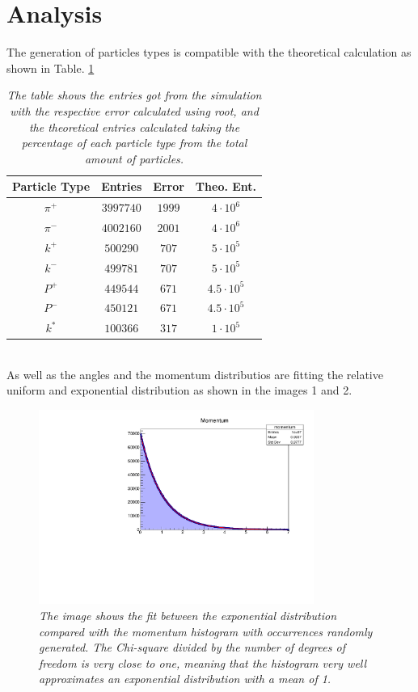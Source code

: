 \documentclass[a4paper, 11pt]{article}
\begin{document}
    \section{Analysis}
    The generation of particles types is compatible with the theoretical calculation as shown in Table. \ref{table2:Table 2}
    \begin{table}[h!]
      \centering
      \begin{tabular}{ c c c c }
        \hline
        Particle Type & Entries & Error & Theo. Ent. \\
        \hline
        $\pi^+$ & $3997740$ & $1999$ & $4\cdot10^6$\\
        $\pi^-$ & $4002160$ & $2001$ & $4\cdot10^6$\\
        $k^+$ & $500290$ & $707$ & $5\cdot10^5$\\
        $k^-$ & $499781$ & $707$ & $5\cdot10^5$\\
        $P^+$ & $449544$ & $671$ & $4.5\cdot10^5$\\
        $P^-$ & $450121$ & $671$ & $4.5\cdot10^5$\\
        $k^*$ & $100366$ & $317$ & $1\cdot10^5$\\
        \hline
      \end{tabular}
      \caption{ \label{table2:Table 2}
      \textit{The table shows the entries got from the simulation with the respective error calculated using root, and the theoretical entries calculated taking the percentage of each particle type from the total amount of particles.}
      }
    \end{table}\\
    As well as the angles and the momentum distributios are fitting the relative uniform and exponential distribution as shown in the images 1 and 2.
    \begin{figure}[h!]
      \centering
      \includegraphics[width=9cm]{c1.pdf}
      \caption{\label{f1} \textit{The image shows the fit between the exponential distribution compared with the momentum histogram with occurrences randomly generated. The Chi-square divided by the number of degrees of freedom is very close to one, meaning that the histogram very well approximates an exponential distribution with a mean of 1.}}
    \end{figure}
\end{document}
